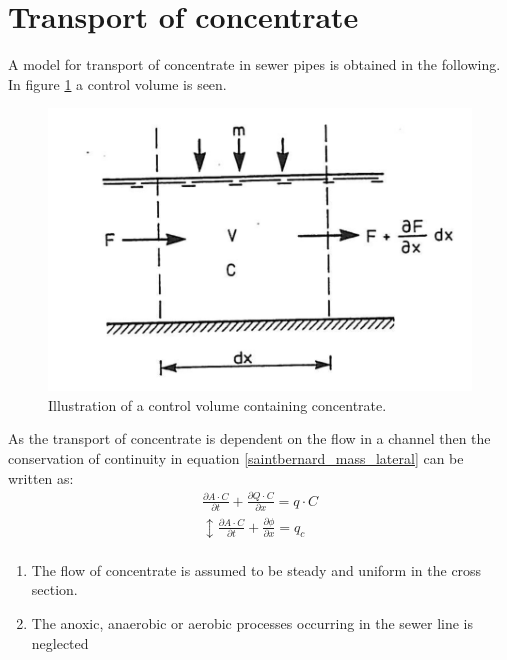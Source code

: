 \section{Transport of concentrate}\label{se:transport_of_concentrate}

A model for transport of concentrate in sewer pipes is obtained in the following.
In figure \ref{fig:poopvolume} a control volume is seen.

\begin{figure}[H]
\centering
\includegraphics[width=.6\textwidth]{report/modeling/pictures/poopvolume.png}
\caption{Illustration of a control volume containing concentrate.}
\label{fig:poopvolume}
\end{figure} 

As the transport of concentrate is dependent on the flow in a channel then the conservation of continuity in equation \ref{saintbernard_mass_lateral} can be written as:
\begin{equation}
\begin{array}{l}
	\frac{\partial A \cdot C}{\partial t} + \frac{\partial Q \cdot C}{\partial x}=q \cdot C \\
	\updownarrow
	\frac{\partial A \cdot C}{\partial t} + \frac{\partial \phi}{\partial x}=q_c \\
\end{array}	
\end{equation}

 \begin{table}[H]
\begin{enumerate}
	\item The flow of concentrate is assumed to be steady and uniform in the cross section.
	\item The anoxic, anaerobic or aerobic processes occurring in the sewer line is neglected   
\end{enumerate}
\label{tab:concentrate_flow}
\end{table}
 


